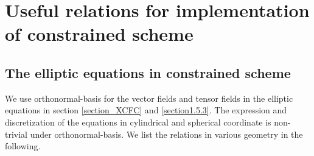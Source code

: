 \chapter{Useful relations for implementation of constrained scheme}
\label{A1}

\section{The elliptic equations in constrained scheme}
We use orthonormal-basis for the vector fields and tensor fields in the elliptic equations in section \ref{section_XCFC} and \ref{section1.5.3}.
The expression and discretization of the equations in cylindrical and spherical coordinate is non-trivial under orthonormal-basis.
We list the relations in various geometry in the following.

